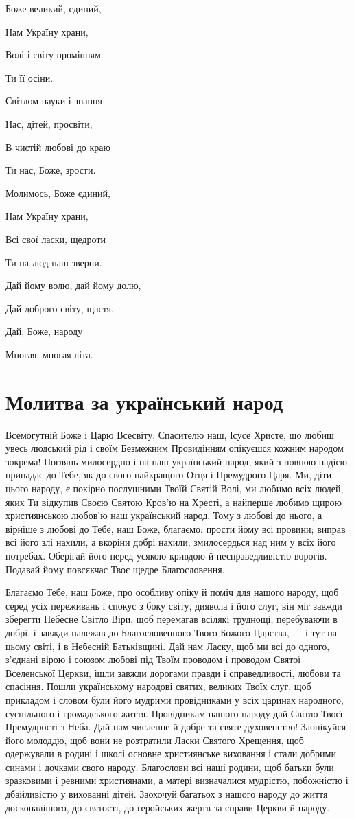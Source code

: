 \documentclass[chapters.tex]{subfiles}
\begin{document}
Боже великий, єдиний,

Нам Україну храни,

Волі і світу промінням

Ти її осіни.

Світлом науки і знання

Нас, дітей, просвіти,

В чистій любові до краю

Ти нас, Боже, зрости.

Молимось, Боже єдиний,

Нам Україну храни,

Всі свої ласки, щедроти

Ти на люд наш зверни.

Дай йому волю, дай йому долю,

Дай доброго світу, щастя,

Дай, Боже, народу

Многая, многая літа.

\section{Молитва за український народ}
Всемогутній Боже і Царю Всесвіту, Спасителю наш, Ісусе Христе, що любиш увесь людський рід і своїм Безмежним Провидінням опікуєшся кожним народом зокрема! Поглянь милосердно і на наш український народ, який з повною надією припадає до Тебе, як до свого найкращого Отця і Премудрого Царя. Ми, діти цього народу, є покірно послушними Твоїй Святій Волі, ми любимо всіх людей, яких Ти відкупив Своєю Святою Кров’ю на Хресті, а найперше любимо щирою християнською любов’ю наш український народ. Тому з любові до нього, а вірніше з любові до Тебе, наш Боже, благаємо: прости йому всі провини; виправ всі його злі нахили, а вкоріни добрі нахили; змилосердься над ним у всіх його потребах. Оберігай його перед усякою кривдою й несправедливістю ворогів. Подавай йому повсякчас Твоє щедре Благословення.

Благаємо Тебе, наш Боже, про особливу опіку й поміч для нашого народу, щоб серед усіх переживань і спокус з боку світу, диявола і його слуг, він міг завжди зберегти Небесне Світло Віри, щоб перемагав всілякі труднощі, перебуваючи в добрі, і завжди належав до Благословенного Твого Божого Царства, — і тут на цьому світі, і в Небесній Батьківщині. Дай нам Ласку, щоб ми всі до одного, з’єднані вірою і союзом любові під Твоїм проводом і проводом Святої Вселенської Церкви, ішли завжди дорогами правди і справедливості, любови та спасіння. Пошли українському народові святих, великих Твоїх слуг, щоб прикладом і словом були його мудрими провідниками у всіх царинах народного, суспільного і громадського життя. Провідникам нашого народу дай Світло Твоєї Премудрості з Неба. Дай нам численне й добре та святе духовенство! Заопікуйся його молоддю, щоб вони не розтратили Ласки Святого Хрещення, щоб одержували в родині і школі основне християнське виховання і стали добрими синами і дочками свого народу. Благослови всі наші родини, щоб батьки були зразковими і ревними християнами, а матері визначалися мудрістю, побожністю і дбайливістю у вихованні дітей. Заохочуй багатьох з нашого народу до життя досконалішого, до святості, до геройських жертв за справи Церкви й народу.
\end{document}
